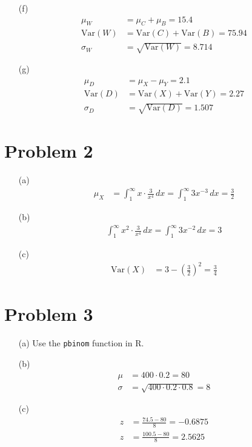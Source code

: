\documentclass{article}
\begin{document}
\begin{enumerate}
    \item[(f)]
    \begin{align*}
        \mu_W &= \mu_C + \mu_B = 15.4 \\
        \text{Var}(W) &= \text{Var}(C) + \text{Var}(B) = 75.94 \\
        \sigma_W &= \sqrt{\text{Var}(W)} = 8.714
    \end{align*}

    \item[(g)]
    \begin{align*}
        \mu_D &= \mu_X - \mu_Y = 2.1 \\
        \text{Var}(D) &= \text{Var}(X) + \text{Var}(Y) = 2.27 \\
        \sigma_D &= \sqrt{\text{Var}(D)} = 1.507
    \end{align*}
\end{enumerate}

\section*{Problem 2}
\begin{enumerate}
    \item[(a)]
    \begin{align*}
        \mu_X &= \int_1^\infty x \cdot \frac{3}{x^4} \, dx = \int_1^\infty 3x^{-3} \, dx = \frac{3}{2}
    \end{align*}

    \item[(b)]
    \begin{align*}
        \int_1^\infty x^2 \cdot \frac{3}{x^4} \, dx = \int_1^\infty 3x^{-2} \, dx = 3
    \end{align*}

    \item[(c)]
    \begin{align*}
        \text{Var}(X) &= 3 - \left( \frac{3}{2} \right)^2 = \frac{3}{4}
    \end{align*}
\end{enumerate}

\section*{Problem 3}
\begin{enumerate}
    \item[(a)] Use the \texttt{pbinom} function in R.
    
    \item[(b)]
    \begin{align*}
        \mu &= 400 \cdot 0.2 = 80 \\
        \sigma &= \sqrt{400 \cdot 0.2 \cdot 0.8} = 8
    \end{align*}

    \item[(c)]
    \begin{align*}
        z &= \frac{74.5 - 80}{8} = -0.6875 \\
        z &= \frac{100.5 - 80}{8} = 2.5625
    \end{align*}
\end{enumerate}
\end{document}
